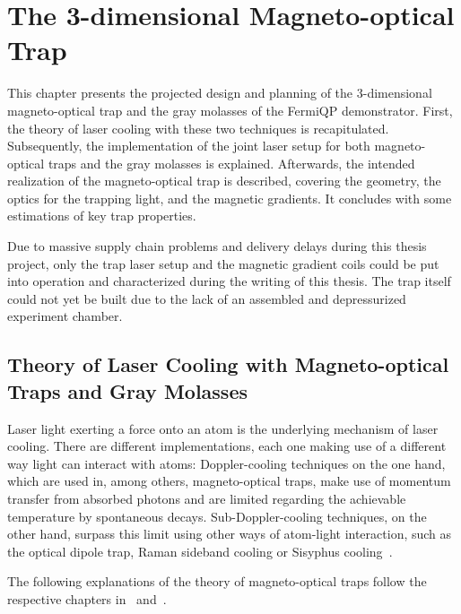 \renewcommand{\imagepath}{../30-mot/img}

\chapter{The 3-dimensional Magneto-optical Trap}\label{ch:mot}

This chapter presents the projected design and planning of the 3-dimensional magneto-optical trap and the gray molasses of the FermiQP demonstrator. First, the theory of laser cooling with these two techniques is recapitulated. Subsequently, the implementation of the joint laser setup for both magneto-optical traps and the gray molasses is explained. Afterwards, the intended realization of the magneto-optical trap is described, covering the geometry, the optics for the trapping light, and the magnetic gradients. It concludes with some estimations of key trap properties.

Due to massive supply chain problems and delivery delays during this thesis project, only the trap laser setup and the magnetic gradient coils could be put into operation and characterized during the writing of this thesis. The trap itself could not yet be built due to the lack of an assembled and depressurized experiment chamber.

\section{Theory of Laser Cooling with Magneto-optical Traps and Gray Molasses}\label{ch:mot_theory}
Laser light exerting a force onto an atom is the underlying mechanism of laser cooling. There are different implementations, each one making use of a different way light can interact with atoms: Doppler-cooling techniques on the one hand, which are used in, among others, magneto-optical traps, make use of momentum transfer from absorbed photons and are limited regarding the achievable temperature by spontaneous decays. Sub-Doppler-cooling techniques, on the other hand, surpass this limit using other ways of atom-light interaction, such as the optical dipole trap, Raman sideband cooling or Sisyphus cooling~\cite{foot_atomic_2005}.

The following explanations of the theory of magneto-optical traps follow the respective chapters in~\cite{foot_atomic_2005} and~\cite{metcalf_laser_1999}.

